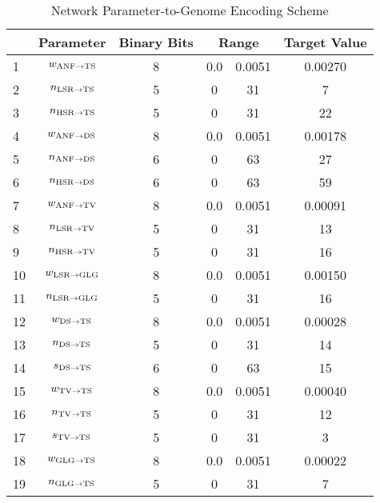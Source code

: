 \begin{table}[tp]
 \centering
 \caption{Network Parameter-to-Genome Encoding Scheme}\label{tab:GA:Genome}
 \begin{tabularx}{0.7\textwidth}{lccccc}   \toprule
  &           Parameter           & Binary Bits & \multicolumn{2}{c}{Range} & Target Value \\\midrule
1  & $w_{{\rm ANF}\to {\rm TS}} $  &  8  & 0.0 &  0.0051   & 0.00270 \\ %
2  & $n_{{\rm LSR}\to {\rm TS}} $  &  5  &  0  &    31     & 7 \\ %
3  & $n_{{\rm HSR}\to {\rm TS}} $  &  5  &  0  &    31     & 22 \\ %
4  & $w_{{\rm ANF}\to {\rm DS}} $  &  8  & 0.0 &  0.0051   & 0.00178 \\ %
5  & $n_{{\rm ANF}\to {\rm DS}} $  &  6  &  0  &    63     & 27 \\ %
6  & $n_{{\rm HSR}\to {\rm DS}} $  &  6  &  0  &    63     & 59 \\ %
7  & $w_{{\rm ANF}\to {\rm TV}} $  &  8  & 0.0 &  0.0051   & 0.00091 \\ %
8  & $n_{{\rm LSR}\to {\rm TV}} $  &  5  &  0  &    31     & 13 \\ %
9  & $n_{{\rm HSR}\to {\rm TV}} $  &  5  &  0  &    31     & 16 \\ %
10 & $w_{{\rm LSR}\to {\rm GLG}} $ &  8  & 0.0 &  0.0051   & 0.00150 \\   %
11 & $n_{{\rm LSR}\to {\rm GLG}} $ &  5  &  0  &    31     & 16 \\   %
12 &  $w_{{\rm DS}\to {\rm TS}} $  &  8  & 0.0 &  0.0051   & 0.00028 \\ %
13 &  $n_{{\rm DS}\to {\rm TS}} $  &  5  &  0  &    31     & 14 \\ %
14 &  $s_{{\rm DS}\to {\rm TS}} $  &  6  &  0  &    63     & 15 \\   %
15 &  $w_{{\rm TV}\to {\rm TS}} $  &  8  & 0.0 &  0.0051   & 0.00040 \\ %
16 &  $n_{{\rm TV}\to {\rm TS}} $  &  5  &  0  &    31     & 12 \\ %
17 &  $s_{{\rm TV}\to {\rm TS}} $  &  5  &  0  &    31     & 3 \\   %
18 & $w_{{\rm GLG}\to {\rm TS}} $  &  8  & 0.0 &  0.0051   & 0.00022 \\ %
19 & $n_{{\rm GLG}\to {\rm TS}} $  &  5  &  0  &    31     & 7 \\ %

\end{tabularx}
\end{table}
